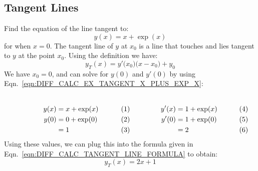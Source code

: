 \documentclass[crop=false,class=book,oneside]{standalone}                      %
\begin{document}
        \subsection{Tangent Lines}
            \begin{lexample}
                Find the equation of the line tangent to:
                \begin{equation}
                    \label{eqn:DIFF_CALC_EX_TANGENT_X_PLUS_EXP_X}
                    y(x)=x+\exp(x)
                \end{equation}
                for when $x=0$.
                The tangent line of $y$ at $x_{0}$
                is a line that touches
                and lies tangent to $y$ at the point $x_{0}$. Using the
                definition we have:
                \begin{equation}
                    \label{eqn:DIFF_CALC_TANGENT_LINE_FORMULA}
                    y_{T}(x)
                    =y'\big(x_{0}\big)\big(x-x_{0}\big)+y_{0}
                \end{equation}
                We have $x_{0}=0$, and can solve for $y(0)$ and $y'(0)$
                by using
                Eqn.~\ref{eqn:DIFF_CALC_EX_TANGENT_X_PLUS_EXP_X}:
                \par
                \begin{subequations}
                    \begin{minipage}[b]{0.49\textwidth}
                        \begin{align}
                            y(x)&=x+\exp(x)\\
                            y(0)&=0+\exp(0)\\
                            &=1
                        \end{align}
                    \end{minipage}
                    \hfill
                    \begin{minipage}[b]{0.49\textwidth}
                        \begin{align}
                            y'(x)&=1+\exp(x)\\
                            y'(0)&=1+\exp(0)\\
                            &=2
                        \end{align}
                    \end{minipage}
                \end{subequations}
                Using these values, we can plug this into the formula
                given in Eqn.~\ref{eqn:DIFF_CALC_TANGENT_LINE_FORMULA}
                to obtain:
                \begin{equation}
                    y_{T}(x)=2x+1
                \end{equation}
            \end{lexample}
\end{document}
